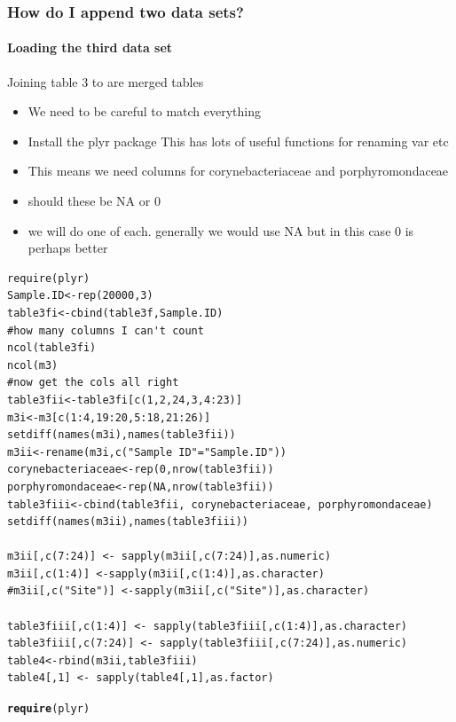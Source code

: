 \documentclass[10pt,handout,english]{beamer}\usepackage[]{graphicx}\usepackage[]{color}
\makeatletter
\newcommand{\hlstd}[1]{\textcolor[rgb]{0.345,0.345,0.345}{#1}}%
\newcommand{\hlkwd}[1]{\textcolor[rgb]{0.737,0.353,0.396}{\textbf{#1}}}%
\newenvironment{kframe}{%
 \def\at@end@of@kframe{}%
 \ifinner\ifhmode%
  \def\at@end@of@kframe{\end{minipage}}%
  \begin{minipage}{\columnwidth}%
 \fi\fi%
 \def\FrameCommand##1{\hskip\@totalleftmargin \hskip-\fboxsep
 \colorbox{shadecolor}{##1}\hskip-\fboxsep
     \hskip-\linewidth \hskip-\@totalleftmargin \hskip\columnwidth}%
 \MakeFramed {\advance\hsize-\width
   \@totalleftmargin\z@ \linewidth\hsize
   \@setminipage}}%
 {\par\unskip\endMakeFramed%
 \at@end@of@kframe}
\newenvironment{knitrout}{}{} %
\makeatother
\begin{document}
\begin{frame}[fragile]
  \frametitle{How do I append two data sets?}
  \framesubtitle{Loading the third data set}
  \begin{block}{Joining table 3 to are merged tables}
  \begin{itemize}
  \item We need to be careful to match everything
  \item Install the plyr package This has lots of useful functions for renaming var etc
  \item This means we need columns for corynebacteriaceae and porphyromondaceae
  \item should these be NA or 0
  \item we will do one of each. generally we would use NA but in this case 0 is perhaps better
 \end{itemize}
  \end{block}
\begin{lstlisting} 
require(plyr)
Sample.ID<-rep(20000,3)
table3fi<-cbind(table3f,Sample.ID)
#how many columns I can't count
ncol(table3fi)
ncol(m3)
#now get the cols all right
table3fii<-table3fi[c(1,2,24,3,4:23)]
m3i<-m3[c(1:4,19:20,5:18,21:26)]
setdiff(names(m3i),names(table3fii))
m3ii<-rename(m3i,c("Sample ID"="Sample.ID"))
corynebacteriaceae<-rep(0,nrow(table3fii))
porphyromondaceae<-rep(NA,nrow(table3fii))
table3fiii<-cbind(table3fii, corynebacteriaceae, porphyromondaceae)
setdiff(names(m3ii),names(table3fiii))

m3ii[,c(7:24)] <- sapply(m3ii[,c(7:24)],as.numeric)
m3ii[,c(1:4)] <-sapply(m3ii[,c(1:4)],as.character)
#m3ii[,c("Site")] <-sapply(m3ii[,c("Site")],as.character)

table3fiii[,c(1:4)] <- sapply(table3fiii[,c(1:4)],as.character)
table3fiii[,c(7:24)] <- sapply(table3fiii[,c(7:24)],as.numeric)
table4<-rbind(m3ii,table3fiii)
table4[,1] <- sapply(table4[,1],as.factor)
\end{lstlisting}
  
\begin{knitrout}
\color{fgcolor}\begin{kframe}
\begin{alltt}
\hlkwd{require}\hlstd{(plyr)}
\end{alltt}



\end{kframe}
\end{knitrout}
\end{frame}
\end{document}
